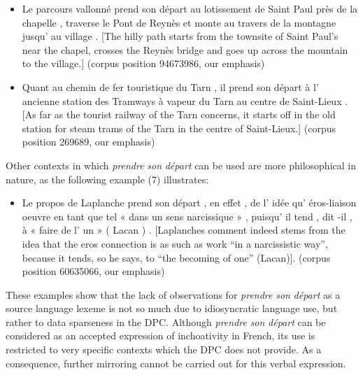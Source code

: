 \begin{itemize}
\item \begin{styleVoorbeeld}
Le parcours vallonné prend son départ au lotissement de Saint Paul près de la chapelle , traverse le Pont de Reynès et monte au travers de la montagne jusqu' au village . [The hilly path starts from the townsite of Saint Paul’s near the chapel, crosses the Reynès bridge and goes up across the mountain to the village.] (corpus position 94673986, our emphasis)
\end{styleVoorbeeld}\item \begin{styleVoorbeeld}
Quant au chemin de fer touristique du Tarn , il prend son départ à l' ancienne station des Tramways à vapeur du Tarn au centre de Saint-Lieux . [As far as the tourist railway of the Tarn concerns, it starts off in the old station for steam trams of the Tarn in the centre of Saint-Lieux.] (corpus position 269689, our emphasis)
\end{styleVoorbeeld}\end{itemize}

Other contexts in which \textit{prendre} \textit{son} \textit{départ} can be used are more philosophical in nature, as the following example (7) illustrates:

\begin{itemize}
\item \begin{styleVoorbeeld}
Le propos de Laplanche prend son départ , en effet , de l' idée qu' éros-liaison oeuvre en tant que tel « dans un sens narcissique » , puisqu' il tend , dit -il , à « faire de l' un » ( Lacan ) . [Laplanches comment indeed stems from the idea that the eros connection is as such as work “in a narcissistic way”, because it tends, so he says, to “the becoming of one” (Lacan)]. (corpus position 60635066, our emphasis)
\end{styleVoorbeeld}\end{itemize}

These examples show that the lack of observations for \textit{prendre} \textit{son} \textit{départ} as a source language lexeme is not so much due to idiosyncratic language use, but rather to data sparseness in the DPC. Although \textit{prendre} \textit{son} \textit{départ} can be considered as an accepted expression of inchoativity in French, its use is restricted to very specific contexts which the DPC does not provide. As a consequence, further mirroring cannot be carried out for this verbal expression.

